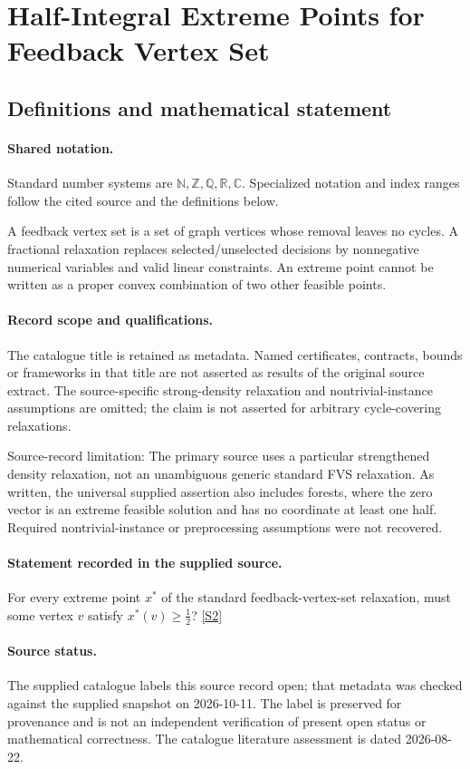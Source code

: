 \documentclass[11pt]{article}
\newcommand{\sref}[2]{\hyperlink{source:#1:#2}{[S#2]}}
\begin{document}
\section{Half-Integral Extreme Points for Feedback Vertex Set}\label{statement}

\subsection{Definitions and mathematical statement}

\paragraph{Shared notation.}Standard number systems are $\mathbb N,\mathbb Z,\mathbb Q,\mathbb R,\mathbb C$. Specialized notation and index ranges follow the cited source and the definitions below.


A feedback vertex set is a set of graph vertices whose removal leaves no cycles. A fractional relaxation replaces selected/unselected decisions by nonnegative numerical variables and valid linear constraints. An extreme point cannot be written as a proper convex combination of two other feasible points.
\paragraph{Record scope and qualifications.}
The catalogue title is retained as metadata. Named certificates, contracts, bounds or frameworks in that title are not asserted as results of the original source extract.
The source-specific strong-density relaxation and nontrivial-instance assumptions are omitted; the claim is not asserted for arbitrary cycle-covering relaxations.

Source-record limitation: The primary source uses a particular strengthened density relaxation, not an unambiguous generic standard FVS relaxation. As written, the universal supplied assertion also includes forests, where the zero vector is an extreme feasible solution and has no coordinate at least one half. Required nontrivial-instance or preprocessing assumptions were not recovered.
\paragraph{Statement recorded in the supplied source.}
For every extreme point $x^*$ of the standard feedback-vertex-set relaxation, must some vertex $v$ satisfy $x^*(v)\geq\tfrac12$? \sref{statement}{2}
\paragraph{Source status.}
The supplied catalogue labels this source record open; that metadata was checked against the supplied snapshot on 2026-10-11. The label is preserved for provenance and is not an independent verification of present open status or mathematical correctness. The catalogue literature assessment is dated 2026-08-22.
\end{document}
